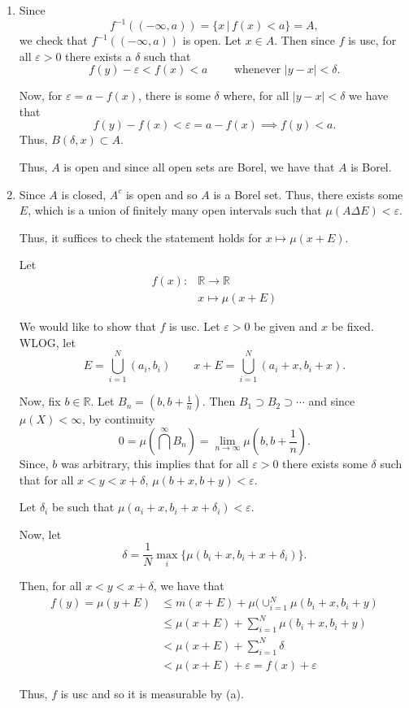 \documentclass[12pt]{Qual}
\begin{document}
\begin{solution}$\,$
\begin{enumerate}[label=(\alph*)]
    \item Since $$f^{-1}((-\infty,a))=\{x\,|\,f(x)<a\}=A,$$ we check that $f^{-1}((-\infty,a))$ is open. Let $x\in A.$ Then since $f$ is usc, for all $\varepsilon>0$ there exists a $\delta$ such that $$f(y)-\varepsilon<f(x)<a\qquad\text{ whenever }|y-x|<\delta.$$

    Now, for $\varepsilon=a-f(x)$, there is some $\delta$ where, for all $|y-x|<\delta$ we have that $$f(y)-f(x)<\varepsilon=a-f(x)\implies f(y)<a.$$ Thus, $B(\delta,x)\subset A$.

    Thus, $A$ is open and since all open sets are Borel, we have that $A$ is Borel.
    \item Since $A$ is closed, $A^c$ is open and so $A$ is a Borel set. Thus, there exists some $E$, which is a union of finitely many open intervals such that $\mu(A\Delta E)<\varepsilon.$

    Thus, it suffices to check the statement holds for $x\mapsto\mu(x+E).$

    Let \begin{align*}
        f(x):&\mathbb{R}\to\mathbb{R}\\
        &x\mapsto\mu(x+E)
    \end{align*}

    We would like to show that $f$ is usc. Let $\varepsilon>0$ be given and $x$ be fixed. WLOG, let $$E=\bigcup_{i=1}^N(a_i,b_i)\qquad x+E=\bigcup_{i=1}^N(a_i+x,b_i+x).$$

    Now, fix $b\in\mathbb{R}$. Let $B_n=(b,b+\frac{1}{n})$. Then $B_1\supset B_2\supset \cdots$ and since $\mu(X)<\infty$, by continuity $$0=\mu(\bigcap^\infty B_n)=\lim_{n\to\infty}\mu(b,b+\frac{1}{n}).$$ Since, $b$ was arbitrary, this implies that for all $\varepsilon>0$ there exists some $\delta$ such that for all $x<y<x+\delta$, $\mu(b+x,b+y)<\varepsilon$.

    Let $\delta_i$ be such that $\mu(a_i+x,b_i+x+\delta_i)<\varepsilon.$

    Now, let $$\delta=\frac{1}{N}\max_i\{\mu(b_i+x,b_i+x+\delta_i)\}.$$

    Then, for all $x<y<x+\delta$, we have that \begin{align*}
        f(y)=\mu(y+E)&\le m(x+E)+\mu(\cup_{i=1}^N\mu(b_i+x,b_i+y)\\
        &\le\mu(x+E)+\sum_{i=1}^N\mu(b_i+x,b_i+y)\\
        &<\mu(x+E)+\sum_{i=1}^N\delta\\
        &<\mu(x+E)+\varepsilon=f(x)+\varepsilon
    \end{align*}

    Thus, $f$ is usc and so it is measurable by (a).
 \end{enumerate}
\end{solution}
\newpage
\end{document}
